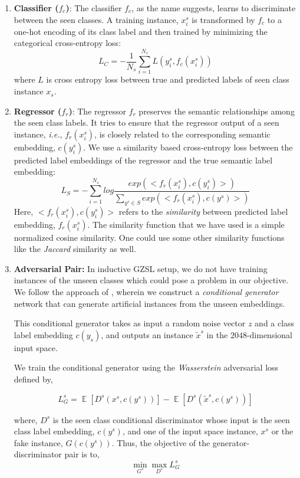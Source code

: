 \documentclass{article}
\DeclareMathOperator{\E}{\mathbb{E}}
\begin{document}
\begin{enumerate}
	\item \textbf{Classifier ($f_c$)}: The classifier $f_c$, as the name suggests, learns to discriminate between the seen classes. 
	A training instance, $x_i^s$ is transformed by $f_c$ to a one-hot encoding of its class label and then trained by minimizing the categorical cross-entropy loss:
	\begin{equation}
		L_C = - \frac{1}{N_s} \sum_{i=1}^{N_s}{L(y_i^s, f_c(x_i^s))}
	\end{equation}
	where $L$ is cross entropy loss between true and predicted labels of seen class instance $x_s$.
	
	\item \textbf{Regressor ($f_r$)}: The regressor $f_r$ preserves the semantic relationships among the seen class labels.
	It tries to ensure that the regressor output of a seen instance, \textit{i.e.}, $f_r(x_i^s)$, is closely related to the corresponding semantic embedding, $c(y_i^s)$. We use a similarity based cross-entropy loss between the predicted label embeddings of the regressor and the true semantic label embedding:
	\begin{equation}
		L_S = - \sum_{i=1}^{N_s} log \frac{exp(<f_r(x_i^s), c(y_i^s)>)}{\sum_{y^s \in S} exp(<f_r(x_i^s), c(y^s)>)}
	\end{equation}
	Here, $<f_r(x_i^s), c(y_i^s)>$ refers to the \textit{similarity} between predicted label embedding, $f_r(x_i^s)$. The similarity function that we have used is a simple normalized cosine similarity. One could use some other similarity functions like the \textit{Jaccard} similarity as well.

	\item \textbf{Adversarial Pair:} 
	In inductive GZSL setup, we do not have training instances of the unseen classes which could pose a problem in our objective. We follow the approach of \citet{sabr25}, wherein we construct a \textit{conditional generator} network that can generate artificial instances from the unseen embeddings. 

	This conditional generator takes as input a random noise vector $z$ and a class label embedding $c(y_s)$,  and outputs an instance $\tilde{x}^s$ in the $2048$-dimensional input space. 

	We train the conditional generator using the \textit{Wasserstein} adversarial loss defined by,
	
	\begin{equation*}
		L_G^s = \E[D^s(x^s, c(y^s))] - \E[D^s(\tilde{x}^s, c(y^s))]
	\end{equation*}
	
	where, $D^s$ is the seen class conditional discriminator whose input is the seen class label embedding, $c(y^s)$, and one of the input space instance, ${x}^s$ or the fake instance,   $G(c(y^s))$. Thus, the objective of the generator-discriminator pair is to,
	\begin{equation}
		\min_{G^s} \max_{D^s}	L_G^s
	\end{equation}
\end{enumerate}
\end{document}
